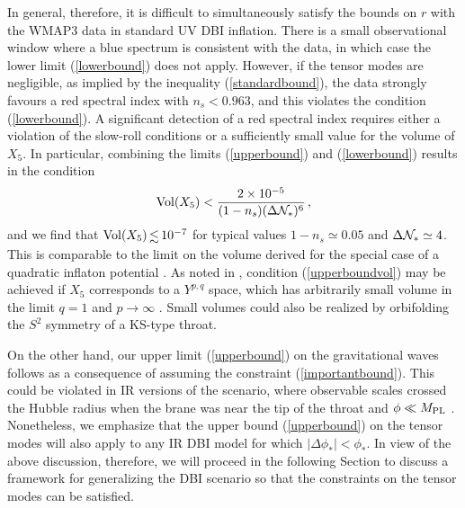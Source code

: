 In general, therefore, it is difficult to simultaneously satisfy 
the bounds on $r$ with the WMAP3 data
in standard UV DBI inflation. There is a 
small observational window where a blue spectrum is consistent 
with the data, in which case the lower limit 
(\ref{lowerbound}) does not apply. 
However, if the tensor modes are negligible,
as implied by the inequality (\ref{standardbound}), the 
data strongly favours a red spectral index with $n_s < 0.963$,
and this violates the condition (\ref{lowerbound}). A significant 
detection of a red spectral index requires either a 
violation of the slow-roll conditions or a sufficiently 
small value for the volume of $X_5$. 
In particular, combining the limits
(\ref{upperbound}) and (\ref{lowerbound}) results in the condition 
\begin{equation}
\label{upperboundvol}
\mathrm{Vol}(X_5) < \frac{2 \times 10^{-5}}{(1-n_s) 
(\Delta {\cal{N}}_{*} )^6}  \,,
\end{equation}
and we find that $\mathrm{Vol}(X_5) \, \lsim \, 10^{-7}$ 
for typical values $1-n_s \simeq 0.05$ and 
$\Delta {\cal{N}}_* \simeq 4$. This 
is comparable to the limit on the volume derived for the special case of a 
quadratic inflaton potential \cite{bmpaper}.  
As noted in \cite{bmpaper,bean}, condition 
(\ref{upperboundvol}) may be achieved 
if $X_5$ corresponds to a $Y^{p,q}$ space, 
which has arbitrarily small volume in the limit  
$q =1$ and $p \rightarrow \infty$ \cite{gauntlett}. 
Small volumes could also be realized 
by orbifolding the $S^2$ symmetry of a KS-type throat. 

On the other hand, 
our upper limit (\ref{upperbound}) on the gravitational waves 
follows as a consequence of assuming 
the constraint (\ref{importantbound}). This  
could be violated in IR versions of the scenario, where
observable scales crossed the Hubble radius when the 
brane was near the tip of the throat and $\phi \ll M_{\mathrm{PL}}$
\cite{brane12,brane14}. 
Nonetheless, we emphasize that the upper bound (\ref{upperbound})
on the tensor modes 
will also apply to any IR DBI model for which 
$|\Delta \phi_* | < \phi_*$.  
In view of the above discussion, therefore, 
we will proceed in the following Section
to discuss a framework for generalizing the DBI scenario so 
that the constraints on the tensor modes can be satisfied. 
% 
% 
% 
% 
